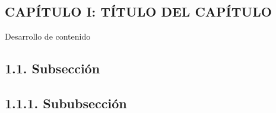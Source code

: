 \medspace
\vspace{1.5cm}
\begin{center}
	\section*{\large CAPÍTULO I: TÍTULO DEL CAPÍTULO}
\end{center}

\vspace{1cm}

Desarrollo de contenido

\subsection*{\normalsize 1.1. Subsección}


\subsection*{\normalsize 1.1.1. Sububsección}